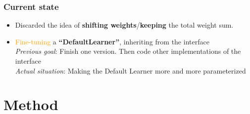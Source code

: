 \begin{frame}
\frametitle{Current state} \vspace{-1cm}
\begin{itemize}	
	\item Discarded the idea of \textbf{shifting weights}/\textbf{keeping} the total weight sum.\newline
	\item \textcolor{orange}{Fine-tuning} a \textbf{\enquote{DefaultLearner}}, inheriting from 
	the interface\\
	\textit{Previous goal}: Finish one version. Then code other implementations of the interface\\
	\textit{Actual situation}: Making the Default Learner more and more parameterized	
\end{itemize}
\end{frame}


\section{Method}


